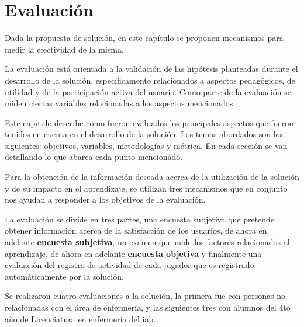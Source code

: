 \chapter{Evaluación}

Dada la propuesta de solución, en este capítulo se proponen mecanismos para medir la
efectividad de la misma.

La evaluación está orientada a la validación de las hipótesis planteadas durante
el desarrollo de la solución, específicamente relacionados a aspectos
pedagógicos, de utilidad y de la participación activa del usuario. Como parte de la 
evaluación se miden ciertas variables relacionadas a los aspectos mencionados.

Este capítulo describe como fueron evaluados los principales aspectos que fueron
tenidos en cuenta en el desarrollo de la solución. Los temas abordados son los siguientes:
objetivos, variables, metodologías y métrica. En cada sección se van detallando
lo que abarca cada punto mencionado.


Para la obtención de la información deseada acerca de la utilización de la
solución y de su impacto en el aprendizaje, se utilizan tres mecanismos que en
conjunto nos ayudan a responder a los objetivos de la evaluación.

La evaluación se divide en tres partes, una encuesta subjetiva que pretende
obtener información acerca de la satisfacción de los usuarios, de ahora en
adelante \textbf{encuesta subjetiva}, un examen que mide los factores
relacionados al aprendizaje, de ahora en adelante \textbf{encuesta objetiva}  y
finalmente una evaluación del registro de actividad de cada jugador que es
registrado automáticamente por la solución.


Se realizaron cuatro evaluaciones a la solución, la primera fue con personas
no relacionadas con el área de enfermería, y las siguientes tres con alumnos del
4to año de Licenciatura en enfermería del \Gls{iab}.







